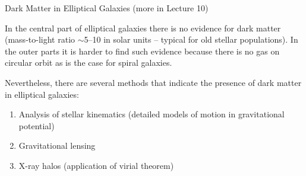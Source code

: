 \documentclass[letterpaper,landscape]{slides}
\begin{document}

\begin{slide}
\begin{center}
{\large \color{red} 
                         Dark Matter in Elliptical Galaxies   (more in Lecture 10)   }
\end{center}

In the central part of elliptical galaxies there is no evidence for 
dark matter (mass-to-light ratio $\sim$5--10 in solar units -- typical
for old stellar populations). In the outer parts it is harder to 
find such evidence because there is no gas on circular orbit as is
the case for spiral galaxies.

Nevertheless, there are several methods that indicate {\color{blue}  the presence
of dark matter in elliptical galaxies:}
\begin{enumerate}
\item Analysis of stellar kinematics (detailed models of motion in 
    gravitational potential)
\item Gravitational lensing
\item X-ray halos (application of virial theorem)
\end{enumerate}


\vfill
\end{slide}
\end{document}
